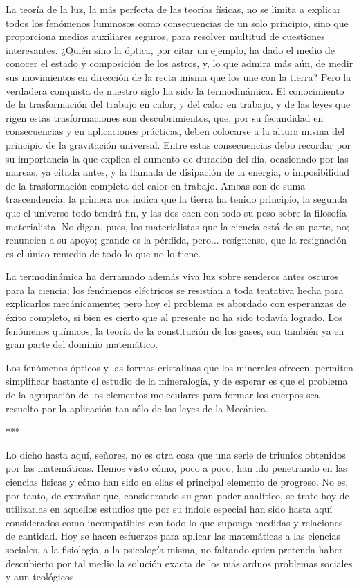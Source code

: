 \documentclass[a4paper, 12pt]{article}
\begin{document}
La teoría de la luz, la más perfecta de las teorías físicas, no se limita a explicar todos los fenómenos luminosos como consecuencias de un solo principio, sino que proporciona medios auxiliares seguros, para resolver multitud de cuestiones interesantes. ¿Quién sino la óptica, por citar un ejemplo, ha dado el medio de conocer el estado y composición de los astros, y, lo que admira más aún, de medir sus movimientos en dirección de la recta misma que los une con la tierra? Pero la verdadera conquista de nuestro siglo ha sido la termodinámica. El conocimiento de la trasformación del trabajo en calor, y del calor en trabajo, y de las leyes que rigen estas trasformaciones son descubrimientos, que, por su fecundidad en consecuencias y en aplicaciones prácticas, deben colocarse a la altura misma del principio de la gravitación universal. Entre estas consecuencias debo recordar por su importancia la que explica el aumento de duración del día, ocasionado por las mareas, ya citada antes, y la llamada de disipación de la energía, o imposibilidad de la trasformación completa del calor en trabajo. Ambas son de suma trascendencia; la primera nos indica que la tierra ha tenido principio, la segunda que el universo todo tendrá fin, y las dos caen con todo su peso sobre la filosofía materialista. No digan, pues, los materialistas que la ciencia está de su parte, no; renuncien a su apoyo; grande es la pérdida, pero... resígnense, que la resignación es el único remedio de todo lo que no lo tiene.

La termodinámica ha derramado además viva luz sobre senderos antes oscuros para la ciencia; los fenómenos eléctricos se resistían a toda tentativa hecha para explicarlos mecánicamente; pero hoy el problema es abordado con esperanzas de éxito completo, si bien es cierto que al presente no ha sido todavía logrado. Los fenómenos químicos, la teoría de la constitución de los gases, son también ya en gran parte del dominio matemático.

Los fenómenos ópticos y las formas cristalinas que los minerales ofrecen, permiten simplificar bastante el estudio de la mineralogía, y de esperar es que el problema de la agrupación de los elementos moleculares para formar los cuerpos sea resuelto por la aplicación tan sólo de las leyes de la Mecánica.


\bigskip

\centerline{***}

Lo dicho hasta aquí, señores, no es otra cosa que una serie de triunfos obtenidos por las matemáticas. Hemos visto cómo, poco a poco, han ido penetrando en las ciencias físicas y cómo han sido en ellas el principal elemento de progreso. No es, por tanto, de extrañar que, considerando su gran poder analítico, se trate hoy de utilizarlas en aquellos estudios que por su índole especial han sido hasta aquí considerados como incompatibles con todo lo que suponga medidas y relaciones de cantidad. Hoy se hacen esfuerzos para aplicar las matemáticas a las ciencias sociales, a la fisiología, a la psicología misma, no faltando quien pretenda haber descubierto por tal medio la solución exacta de los más arduos problemas sociales y aun teológicos.
\end{document}

